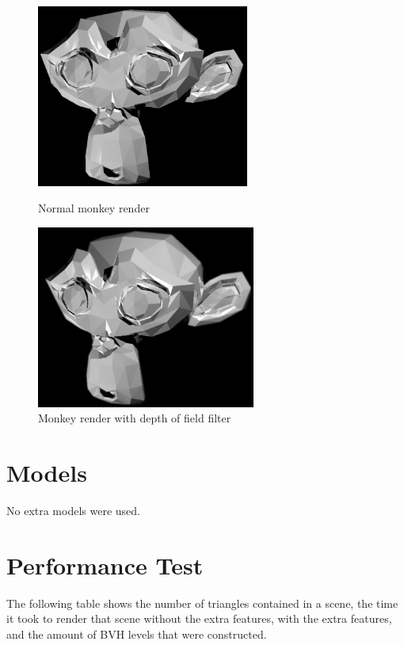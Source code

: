 \documentclass{article}
\begin{document}
    \begin{figure}[!htb]
        \includegraphics[width=\linewidth, height=6cm]{images/monkey_no_bloom}
        \caption*{Normal monkey render}
      \endminipage\hfill
        \includegraphics[width=\linewidth, height=6cm]{images/monkey_dof}
        \caption*{Monkey render with depth of field filter}
      \endminipage
    \end{figure}


    \newpage

    \section{Models}
    No extra models were used.

    \section{Performance Test}
    The following table shows the number of triangles contained in a scene, the time it took to render that 
    scene without the extra features, with the extra features, and the amount of BVH levels that were 
    constructed.
    
\end{document}
